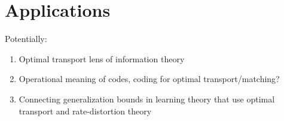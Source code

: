 \documentclass[11pt]{article}
\begin{document}
    

    \section{Applications}
    Potentially:
    \begin{enumerate}
        \item Optimal transport lens of information theory
        \item Operational meaning of codes, coding for optimal transport/matching?
        \item Connecting generalization bounds in learning theory that use optimal transport and rate-distortion theory
    \end{enumerate}


 

\end{document}
